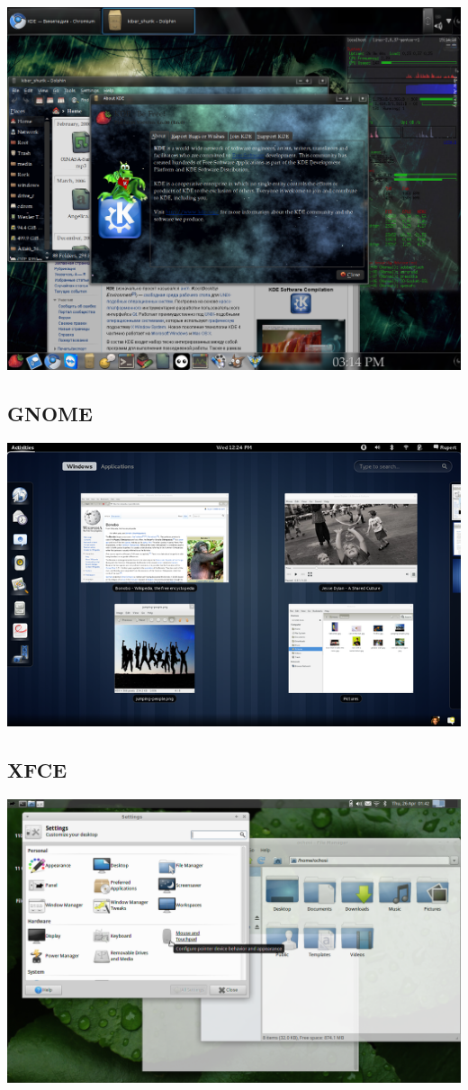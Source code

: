 \includegraphics[scale=0.38]{base/Software/KDE2.png}
\subsection{GNOME}\label{base:software:de:gnome}
\includegraphics[scale=0.5]{base/Software/Gnome.png}
\subsection{XFCE}\label{base:software:de:xfce}
\includegraphics[scale=0.28]{base/Software/XFCE.png}
